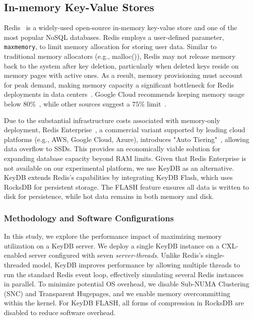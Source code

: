 \subsection{In-memory Key-Value Stores}
\label{ssec:keydb}
Redis~\cite{redis} is a widely-used open-source in-memory key-value store and one of the most popular NoSQL databases. Redis employs a user-defined parameter, \texttt{maxmemory}, to limit memory allocation for storing user data. Similar to traditional memory allocators (e.g., malloc()), Redis may not release memory back to the system after key deletion, particularly when deleted keys reside on memory pages with active ones. As a result, memory provisioning must account for peak demand, making memory capacity a significant bottleneck for Redis deployments in data centers~\cite{manageredis}. Google Cloud recommends keeping memory usage below $80\%$~\cite{googlecloud}, while other sources suggest a $75\%$ limit~\cite{manageredis}.

Due to the substantial infrastructure costs associated with memory-only deployment, Redis Enterprise~\cite{redisenterprise}, a commercial variant supported by leading cloud platforms (e.g., AWS, Google Cloud, Azure), introduces "Auto Tiering"~\cite{redisautotiering}, allowing data overflow to SSDs. This provides an economically viable solution for expanding database capacity beyond RAM limits. Given that Redis Enterprise is not available on our experimental platform, we use KeyDB as an alternative. KeyDB extends Redis's capabilities by integrating KeyDB Flash, which uses RocksDB for persistent storage. The FLASH feature ensures all data is written to disk for persistence, while hot data remains in both memory and disk.

\subsubsection{Methodology and Software Configurations}

In this study, we explore the performance impact of maximizing memory utilization on a KeyDB server. We deploy a single KeyDB instance on a CXL-enabled server configured with seven \textit{server-threads}. Unlike Redis's single-threaded model, KeyDB improves performance by allowing multiple threads to run the standard Redis event loop, effectively simulating several Redis instances in parallel. To minimize potential OS overhead, we disable Sub-NUMA Clustering (SNC) and Transparent Hugepages, and we enable memory overcommitting within the kernel. For KeyDB FLASH, all forms of compression in RocksDB are disabled to reduce software overhead. 

